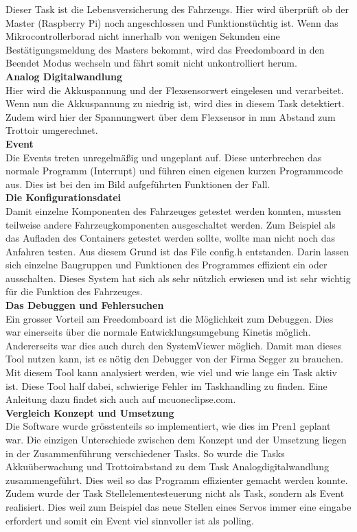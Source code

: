Dieser Task ist die Lebensversicherung des Fahrzeugs. Hier wird überprüft ob der Master (Raspberry Pi) noch angeschlossen und Funktionstüchtig ist. Wenn das Mikrocontrollerborad nicht innerhalb von wenigen Sekunden eine Bestätigungsmeldung des Masters bekommt, wird das Freedomboard in den Beendet Modus wechseln und fährt somit nicht unkontrolliert herum. \\[0.2cm]
\textbf{Analog Digitalwandlung}\\[0.2cm]
Hier wird die Akkuspannung und der Flexsensorwert eingelesen und verarbeitet. Wenn nun die Akkuspannung zu niedrig ist, wird dies in diesem Task detektiert. Zudem wird hier der Spannungwert über dem Flexsensor in mm Abstand zum Trottoir umgerechnet.\\[0.2cm]
\textbf{Event}\\[0.2cm]
Die Events treten unregelmäßig und ungeplant auf. Diese unterbrechen das normale Programm (Interrupt) und führen einen eigenen kurzen Programmcode aus. Dies ist bei den im Bild aufgeführten Funktionen der Fall.\\[0.2cm]
\textbf{Die Konfigurationsdatei}\\[0.2cm]
Damit einzelne Komponenten des Fahrzeuges getestet werden konnten, mussten teilweise andere Fahrzeugkomponenten ausgeschaltet werden. Zum Beispiel als das Aufladen des Containers getestet werden sollte, wollte man nicht noch das Anfahren testen. Aus diesem Grund ist das File config.h entstanden. Darin lassen sich einzelne Baugruppen und Funktionen des Programmes effizient ein oder ausschalten. Dieses System hat sich als sehr nützlich erwiesen und ist sehr wichtig für die Funktion des Fahrzeuges.\\[0.2cm]
\textbf{Das Debuggen und Fehlersuchen}\\[0.2cm]
Ein grosser Vorteil am Freedomboard ist die Möglichkeit zum Debuggen. Dies war einerseits über die normale Entwicklungsumgebung Kinetis möglich. Andererseits war dies auch durch den SystemViewer möglich. Damit man dieses Tool nutzen kann, ist es nötig den Debugger von der Firma Segger zu brauchen. Mit diesem Tool kann analysiert werden, wie viel und wie lange ein Task aktiv ist. Diese Tool half dabei, schwierige Fehler im Taskhandling zu finden. Eine Anleitung dazu findet sich auch auf mcuoneclipse.com.\\[0.2cm]
\textbf{Vergleich Konzept und Umsetzung}\\[0.2cm]
Die Software wurde grösstenteils so implementiert, wie dies im Pren1 geplant war. Die einzigen Unterschiede zwischen dem Konzept und der Umsetzung liegen in der Zusammenführung verschiedener Tasks. So wurde die Tasks Akkuüberwachung und Trottoirabstand zu dem Task Analogdigitalwandlung zusammengeführt. Dies weil so das Programm effizienter gemacht werden konnte. Zudem wurde der Task Stellelementesteuerung nicht als Task, sondern als Event realisiert. Dies weil zum Beispiel das neue Stellen eines Servos immer eine eingabe erfordert und somit ein Event viel sinnvoller ist als polling. 
